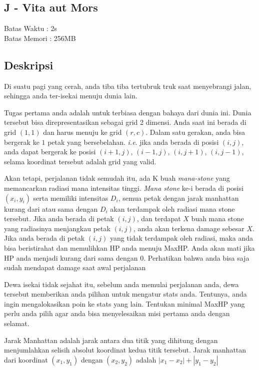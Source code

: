 \documentclass{article}
\begin{document}
\begin{center}
    \section*{J - Vita aut Mors} %
    Batas Waktu : 2s \\  %
    Batas Memori :  256MB \\ %
\end{center}

\subsection*{Deskripsi}

Di suatu pagi yang cerah, anda tiba tiba tertubruk truk saat menyebrangi jalan, sehingga anda ter-isekai menuju dunia lain.

Tugas pertama anda adalah untuk terbiasa dengan bahaya dari dunia ini. Dunia tersebut bisa direpresentasikan sebagai grid 2 dimensi. Anda saat ini berada di grid $(1, 1)$ dan harus menuju ke grid $(r, c)$. Dalam satu gerakan, anda bisa bergerak ke $1$ petak yang bersebelahan. \textit{i.e}. jika anda berada di posisi $(i, j)$, anda dapat bergerak ke posisi $(i+1, j)$, $(i-1, j)$, $(i, j+1)$, $(i, j-1)$, selama koordinat tersebut adalah grid yang valid.

Akan tetapi, perjalanan tidak semudah itu, ada K buah \textit{mana-stone} yang memancarkan radiasi mana intensitas tinggi. \textit{Mana stone} ke-i berada di posisi $(x_i, y_i)$ serta memiliki intensitas $D_i$, semua petak dengan jarak manhattan kurang dari atau sama dengan $D_i$ akan terdampak oleh radiasi mana stone tersebut. Jika anda berada di petak $(i, j)$, dan terdapat $X$ buah mana stone yang radiasinya menjangkau petak $(i, j)$, anda akan terkena damage sebesar $X$. Jika anda berada di petak $(i, j)$ yang tidak terdampak oleh radiasi, maka anda bisa beristirahat dan memulihkan HP anda menuju MaxHP. Anda akan mati jika HP anda menjadi kurang dari sama dengan $0$. Perhatikan bahwa anda bisa saja sudah mendapat damage saat awal perjalanan

Dewa isekai tidak sejahat itu, sebelum anda memulai perjalanan anda, dewa tersebut memberikan anda pilihan untuk mengatur stats anda. Tentunya, anda ingin mengalokasikan poin ke stats yang lain. Tentukan minimal MaxHP yang perlu anda pilih agar anda bisa menyelesaikan misi pertama anda dengan selamat.

Jarak Manhattan adalah jarak antara dua titik yang dihitung dengan menjumlahkan selisih absolut koordinat kedua titik tersebut. Jarak manhattan dari koordinat $(x_1, y_1)$ dengan $(x_2, y_2)$ adalah $|x_1 - x_2| + |y_1 - y_2|$
\end{document}
